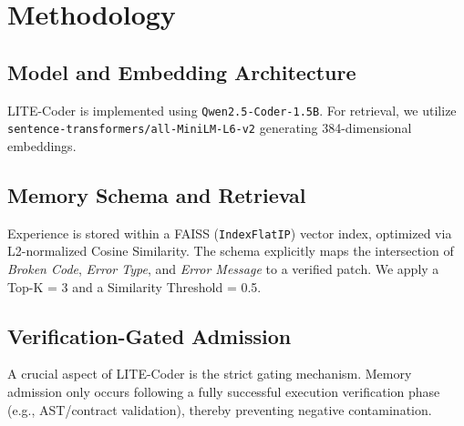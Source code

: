 \section{Methodology}
\subsection{Model and Embedding Architecture}
LITE-Coder is implemented using \texttt{Qwen2.5-Coder-1.5B}. For retrieval, we utilize \texttt{sentence-transformers/all-MiniLM-L6-v2} generating 384-dimensional embeddings.

\subsection{Memory Schema and Retrieval}
Experience is stored within a FAISS (\texttt{IndexFlatIP}) vector index, optimized via L2-normalized Cosine Similarity. The schema explicitly maps the intersection of \textit{Broken Code}, \textit{Error Type}, and \textit{Error Message} to a verified patch. We apply a Top-K = 3 and a Similarity Threshold = 0.5.

\subsection{Verification-Gated Admission}
A crucial aspect of LITE-Coder is the strict gating mechanism. Memory admission only occurs following a fully successful execution verification phase (e.g., AST/contract validation), thereby preventing negative contamination.
